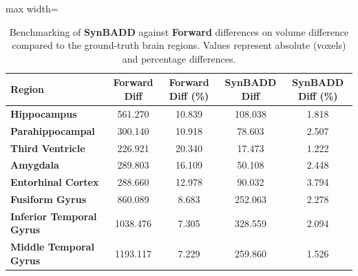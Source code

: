 \begin{table}[ht]
\centering
\caption{Benchmarking of \textbf{SynBADD} against \textbf{Forward} differences on volume difference compared to the ground-truth brain regions. Values represent absolute (voxels) and percentage differences.}
\small
\begin{adjustbox}{max width=\textwidth}
\begin{tabular}{>{\bfseries}lcccc}
\toprule
Region & Forward Diff & Forward Diff (\%) & SynBADD Diff & SynBADD Diff (\%) \\
\midrule
Hippocampus             & 561.270  & 10.839 & 108.038 & 1.818 \\
Parahippocampal         & 300.140  & 10.918 &  78.603 & 2.507 \\
Third Ventricle         & 226.921  & 20.340 &  17.473 & 1.222 \\
Amygdala                & 289.803  & 16.109 &  50.108 & 2.448 \\
Entorhinal Cortex       & 288.660  & 12.978 &  90.032 & 3.794 \\
Fusiform Gyrus          & 860.089  &  8.683 & 252.063 & 2.278 \\
Inferior Temporal Gyrus & 1038.476 &  7.305 & 328.559 & 2.094 \\
Middle Temporal Gyrus   & 1193.117 &  7.229 & 259.860 & 1.526 \\
\bottomrule
\end{tabular}
\end{adjustbox}
\label{tab:volume_forward}
\end{table}


